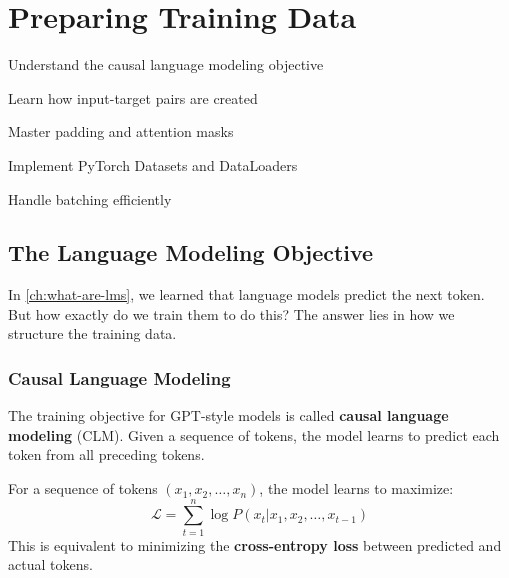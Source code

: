 \chapter{Preparing Training Data}
\label{ch:preparing-data}

\begin{objectives}
    \item Understand the causal language modeling objective
    \item Learn how input-target pairs are created
    \item Master padding and attention masks
    \item Implement PyTorch Datasets and DataLoaders
    \item Handle batching efficiently
\end{objectives}

\section{The Language Modeling Objective}

In \cref{ch:what-are-lms}, we learned that language models predict the next token. But how exactly do we train them to do this? The answer lies in how we structure the training data.

\subsection{Causal Language Modeling}

The training objective for GPT-style models is called \textbf{causal language modeling} (CLM). Given a sequence of tokens, the model learns to predict each token from all preceding tokens.

\begin{definition}[title=Causal Language Modeling]
For a sequence of tokens $(x_1, x_2, \ldots, x_n)$, the model learns to maximize:
\[
\mathcal{L} = \sum_{t=1}^{n} \log P(x_t | x_1, x_2, \ldots, x_{t-1})
\]
This is equivalent to minimizing the \textbf{cross-entropy loss} between predicted and actual tokens.
\end{definition}

